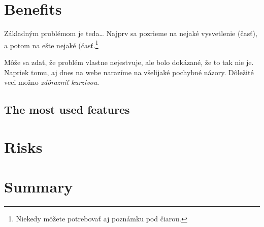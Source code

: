 \documentclass[10pt,oneside,english,coursepaper]{article}
\begin{document}
\section{Benefits} \label{benefits}

Základným problémom je teda\ldots{} Najprv sa pozrieme na nejaké vysvetlenie (časť), a potom na ešte nejaké (časť.\footnote{Niekedy môžete potrebovať aj poznámku pod čiarou.}

Môže sa zdať, že problém vlastne nejestvuje, ale bolo dokázané, že to tak nie je. Napriek tomu, aj dnes na webe narazíme na všelijaké pochybné názory. Dôležité veci možno \emph{zdôrazniť kurzívou}.


\subsection{The most used features} \label{benefits:features}

%
%
%

\section{Risks} \label{risks}

%
%
%

\section{Summary} \label{summary} %

%
%
%





\end{document}
